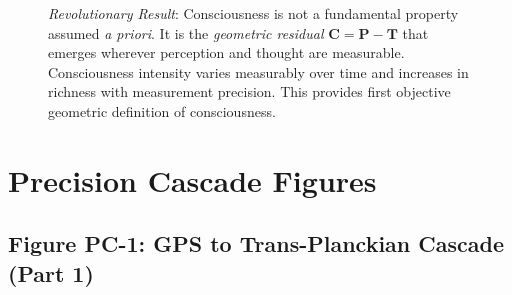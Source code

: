 \documentclass[11pt]{article}
\begin{document}
\begin{figure}[H]
{\textit{Revolutionary Result}: Consciousness is not a fundamental property assumed \textit{a priori}. It is the \textit{geometric residual} $\mathbf{C} = \mathbf{P} - \mathbf{T}$ that emerges wherever perception and thought are measurable. Consciousness intensity varies measurably over time and increases in richness with measurement precision. This provides first objective geometric definition of consciousness.}
\label{fig:gps_consciousness}
\end{figure}

\clearpage

\section{Precision Cascade Figures}

\subsection{Figure PC-1: GPS to Trans-Planckian Cascade (Part 1)}
\end{document}
